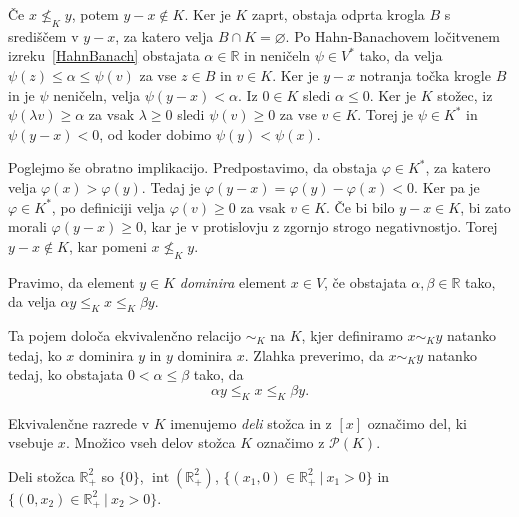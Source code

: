 \documentclass[mat2, tisk]{fmfdelo}
\newcommand{\R}{\mathbb{R}}
\begin{document}
\begin{dokaz}
Če $x \not\leq_K y$, potem $y-x\notin K$. Ker je $K$ zaprt,
obstaja odprta krogla $B$ s središčem v $y-x$, za katero velja
$B\cap K=\varnothing$. Po Hahn-Banachovem ločitvenem
izreku~\ref{HahnBanach} obstajata $\alpha\in\R$ in
neničeln $\psi\in V^*$ tako, da velja
$\psi(z)\leq\alpha\leq\psi(v)$ za vse $z\in B$ in $v\in K$.
Ker je $y-x$ notranja točka krogle $B$ in je $\psi$ neničeln,
velja $\psi(y-x)<\alpha$. Iz $0\in K$ sledi $\alpha\leq0$.
Ker je $K$ stožec, iz $\psi(\lambda v)\geq\alpha$ za vsak
$\lambda\geq0$ sledi $\psi(v)\geq0$ za vse $v\in K$.
Torej je $\psi\in K^*$ in $\psi(y-x)<0$, od koder dobimo
$\psi(y)<\psi(x)$.

Poglejmo še obratno implikacijo. Predpostavimo, da obstaja $\varphi \in K^*$, za katero velja
$\varphi(x) > \varphi(y)$. Tedaj je $\varphi(y - x) = \varphi(y) - \varphi(x) < 0$.
Ker pa je $\varphi \in K^*$, po definiciji velja $\varphi(v) \ge 0$ za vsak $v \in K$.
Če bi bilo $y - x \in K$, bi zato morali  $\varphi(y - x) \ge 0$,
kar je v protislovju z zgornjo strogo negativnostjo.
Torej $y - x \notin K$, kar pomeni $x \not\le_K y$.
\end{dokaz}

\begin{definicija}
  Pravimo, da element $y \in K$ \emph{dominira} element $x \in V$, če
  obstajata $\alpha, \beta \in \mathbb{R}$ tako, da velja
  $\alpha y \leq_K x \leq_K \beta y$.
\end{definicija}

Ta pojem določa ekvivalenčno
relacijo $\sim_K$ na $K$, kjer definiramo $x \sim_K y$ natanko tedaj,
ko $x$ dominira $y$ in $y$ dominira $x$. Zlahka preverimo, da
$x \sim_K y$ natanko tedaj, ko obstajata $0 < \alpha \le \beta$ tako,
da
\[
\alpha y \leq_K x \leq_K \beta y.
\]

\begin{definicija}
  Ekvivalenčne razrede v $K$ imenujemo \emph{deli} stožca in z
  $[x]$ označimo del, ki vsebuje $x$. Množico vseh delov stožca $K$
  označimo z $\mathcal{P}(K)$.
\end{definicija}

\begin{zgled}
  Deli stožca $\mathbb{R}_+^2$ so
  $\{0\}$, $\operatorname{int}(\mathbb{R}_+^2)$,
  $\{(x_1, 0) \in \mathbb{R}_+^2~|~x_1 > 0\}$ in
  $\{(0, x_2) \in \mathbb{R}_+^2~|~x_2 > 0\}$.  
\end{zgled}
\end{document}
